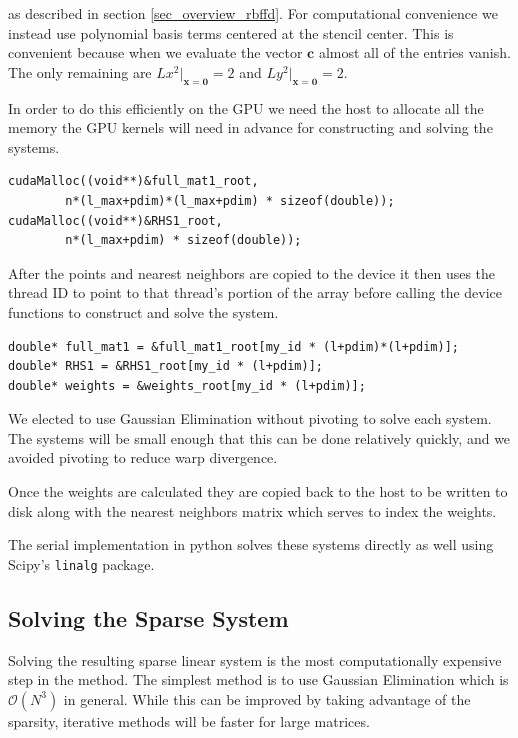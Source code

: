 \documentclass[12pt]{article}
\let\vec\mathbf
\begin{document}
	\noindent as described in section \ref{sec_overview_rbffd}. For computational convenience we instead use polynomial basis terms centered at the stencil center. This is convenient because when we evaluate the vector $\vec{c}$ almost all of the entries vanish. The only remaining are $Lx^2\vert_{\vec{x}=\vec{0}} = 2$ and $Ly^2\vert_{\vec{x}=\vec{0}} = 2$.
	
	In order to do this efficiently on the GPU we need the host to allocate all the memory the GPU kernels will need in advance for constructing and solving the systems. 
	
	\begin{lstlisting}
cudaMalloc((void**)&full_mat1_root, 
		n*(l_max+pdim)*(l_max+pdim) * sizeof(double));
cudaMalloc((void**)&RHS1_root, 
		n*(l_max+pdim) * sizeof(double));
	\end{lstlisting}
	
	\noindent After the points and nearest neighbors are copied to the device it then uses the thread ID to point to that thread's portion of the array before calling the device functions to construct and solve the system.
	
	\begin{lstlisting}
double* full_mat1 = &full_mat1_root[my_id * (l+pdim)*(l+pdim)];
double* RHS1 = &RHS1_root[my_id * (l+pdim)];
double* weights = &weights_root[my_id * (l+pdim)];
	\end{lstlisting}
	
	We elected to use Gaussian Elimination without pivoting to solve each system. The systems will be small enough that this can be done relatively quickly, and we avoided pivoting to reduce warp divergence. 
	
	Once the weights are calculated they are copied back to the host to be written to disk along with the nearest neighbors matrix which serves to index the weights.
	
	The serial implementation in python solves these systems directly as well using Scipy's \texttt{linalg} package. 

\subsection{Solving the Sparse System}

	Solving the resulting sparse linear system is the most computationally expensive step in the method. The simplest method is to use Gaussian Elimination which is $\mathcal{O}(N^3)$ in general. While this can be improved by taking advantage of the sparsity, iterative methods will be faster for large matrices.
	
\end{document}
